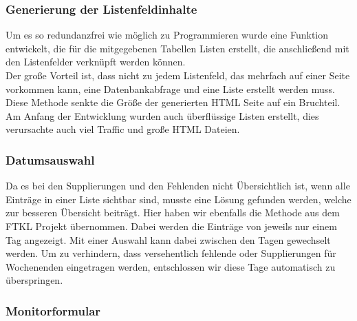 \subsubsection{Generierung der Listenfeldinhalte}
Um es so redundanzfrei wie möglich zu Programmieren wurde eine Funktion entwickelt, die für die mitgegebenen Tabellen Listen erstellt, die anschließend mit den Listenfelder verknüpft werden können.\\
Der große Vorteil ist, dass nicht zu jedem Listenfeld, das mehrfach auf einer Seite vorkommen kann, eine Datenbankabfrage und eine Liste erstellt werden muss. Diese Methode senkte die Größe der generierten HTML Seite auf ein Bruchteil. Am Anfang der Entwicklung wurden auch überflüssige Listen erstellt, dies verursachte auch viel Traffic und große HTML Dateien.
\subsubsection{Datumsauswahl}
Da es bei den Supplierungen und den Fehlenden nicht Übersichtlich ist, wenn alle Einträge in einer Liste sichtbar sind, musste eine Lösung gefunden werden, welche zur besseren Übersicht beiträgt. Hier haben wir ebenfalls die Methode aus dem FTKL Projekt übernommen. Dabei werden die Einträge von jeweils nur einem Tag angezeigt. Mit einer Auswahl kann dabei zwischen den Tagen gewechselt werden. Um zu verhindern, dass versehentlich fehlende oder Supplierungen für Wochenenden eingetragen werden, entschlossen wir diese Tage automatisch zu überspringen.
\subsubsection{Monitorformular}
